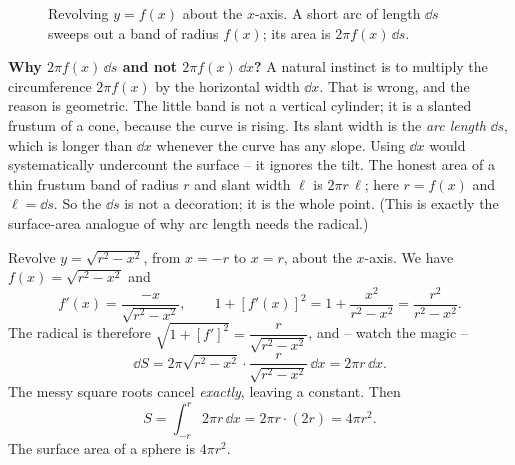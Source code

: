 \begin{figure}[H]
\centering
{}
\caption{Revolving $y=f(x)$ about the $x$-axis. A short arc of length $\dd s$ sweeps
out a band of radius $f(x)$; its area is $2\pi f(x)\,\dd s$.}
\label{ch26:fig-surface}
\end{figure}

\begin{whybox}
\textbf{Why $2\pi f(x)\,\dd s$ and not $2\pi f(x)\,\dd x$?} A natural instinct is
to multiply the circumference $2\pi f(x)$ by the horizontal width $\dd x$. That is
wrong, and the reason is geometric. The little band is not a vertical cylinder; it
is a slanted frustum of a cone, because the curve is rising. Its slant width is the
\emph{arc length} $\dd s$, which is longer than $\dd x$ whenever the curve has any
slope. Using $\dd x$ would systematically undercount the surface -- it ignores the
tilt. The honest area of a thin frustum band of radius $r$ and slant width
$\ell$ is $2\pi r\,\ell$; here $r=f(x)$ and $\ell = \dd s$. So the $\dd s$ is not a
decoration; it is the whole point. (This is exactly the surface-area analogue of
why arc length needs the radical.)
\end{whybox}

\begin{example}
\label{ch26:ex-sphere-surface}
Revolve $y = \sqrt{r^2-x^2}$, from $x=-r$ to $x=r$, about the $x$-axis. We have
$f(x)=\sqrt{r^2-x^2}$ and
\[
  f'(x) = \frac{-x}{\sqrt{r^2-x^2}}, \qquad
  1+[f'(x)]^2 = 1 + \frac{x^2}{r^2-x^2} = \frac{r^2}{r^2-x^2}.
\]
The radical is therefore $\sqrt{1+[f']^2} = \dfrac{r}{\sqrt{r^2-x^2}}$, and -- watch
the magic --
\[
  \dd S = 2\pi\sqrt{r^2-x^2}\cdot\frac{r}{\sqrt{r^2-x^2}}\,\dd x = 2\pi r\,\dd x.
\]
The messy square roots cancel \emph{exactly}, leaving a constant. Then
\[
  S = \int_{-r}^{r} 2\pi r\,\dd x = 2\pi r\cdot(2r) = 4\pi r^2.
\]
The surface area of a sphere is $4\pi r^2$.
\end{example}

